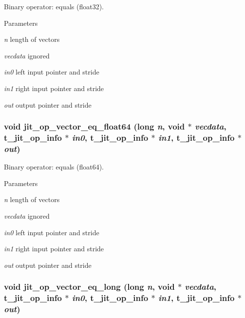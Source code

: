 Binary operator: equals (float32). 
\begin{DoxyParams}{Parameters}
\item[{\em n}]length of vectors \item[{\em vecdata}]ignored \item[{\em in0}]left input pointer and stride \item[{\em in1}]right input pointer and stride \item[{\em out}]output pointer and stride \end{DoxyParams}
\hypertarget{group__opvecmod_gaffe37d753be49e02a1c4b44beff9f1cd}{
\subsubsection[{jit\_\-op\_\-vector\_\-eq\_\-float64}]{\setlength{\rightskip}{0pt plus 5cm}void jit\_\-op\_\-vector\_\-eq\_\-float64 (long {\em n}, \/  void $\ast$ {\em vecdata}, \/  {\bf t\_\-jit\_\-op\_\-info} $\ast$ {\em in0}, \/  {\bf t\_\-jit\_\-op\_\-info} $\ast$ {\em in1}, \/  {\bf t\_\-jit\_\-op\_\-info} $\ast$ {\em out})}}
\label{group__opvecmod_gaffe37d753be49e02a1c4b44beff9f1cd}


Binary operator: equals (float64). 
\begin{DoxyParams}{Parameters}
\item[{\em n}]length of vectors \item[{\em vecdata}]ignored \item[{\em in0}]left input pointer and stride \item[{\em in1}]right input pointer and stride \item[{\em out}]output pointer and stride \end{DoxyParams}
\hypertarget{group__opvecmod_ga86f24545ec76bb050b4272e9e95f3574}{
\subsubsection[{jit\_\-op\_\-vector\_\-eq\_\-long}]{\setlength{\rightskip}{0pt plus 5cm}void jit\_\-op\_\-vector\_\-eq\_\-long (long {\em n}, \/  void $\ast$ {\em vecdata}, \/  {\bf t\_\-jit\_\-op\_\-info} $\ast$ {\em in0}, \/  {\bf t\_\-jit\_\-op\_\-info} $\ast$ {\em in1}, \/  {\bf t\_\-jit\_\-op\_\-info} $\ast$ {\em out})}}
\label{group__opvecmod_ga86f24545ec76bb050b4272e9e95f3574}


